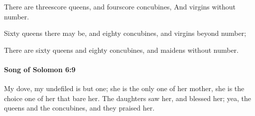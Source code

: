 			\begin{versebox}
					\item[BHS] 
					\item[LXX] 
					\item[ASV] There are threescore queens, and fourscore concubines, And virgins without number.
					\item[NIV] Sixty queens there may be, and eighty concubines, and virgins beyond number;
					\item[NRSV] There are sixty queens and eighty concubines, and maidens without number.
			\end{versebox}

		\paragraph{Song of Solomon 6:9} %
			\label{SONGOFSOLOMON-6-9}

			My dove, my undefiled is but one; she is the only one of her mother, she is the choice one of her that bare her. The daughters saw her, and blessed her; yea, the queens and the concubines, and they praised her.

